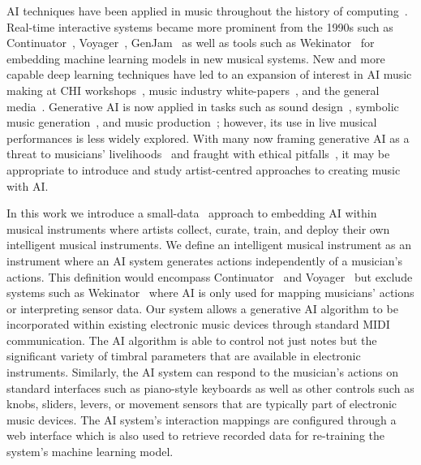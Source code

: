 \documentclass[manuscript,review,anonymous]{acmart}
\begin{document}
AI techniques have been applied in music throughout the history of computing~\cite{roads-music-AI-1985}. Real-time interactive systems became more prominent from the 1990s such as Continuator~\cite{Pachet:2003wd},  Voyager~\cite{Lewis:2000fu}, GenJam~\cite{Biles:2007aa} as well as tools such as Wekinator~\cite{fiebrink_meta-instrument_2009} for embedding machine learning models in new musical systems.
New and more capable deep learning techniques have led to an expansion of interest in AI music making at CHI workshops~\cite{genaichi2022}, music industry white-papers~\cite{goldmedia_ai_2024}, and the general media~\cite{musicpublishers}. Generative AI is now applied in tasks such as sound design~\cite{sound_design_ai_2024}, symbolic music generation~\cite{ji_survey_2024}, and music production~\cite{deruty_development_2022}; however, its use in live musical performances is less widely explored.
With many now framing generative AI as a threat to musicians' livelihoods~\cite{goldmedia_ai_2024} and fraught with ethical pitfalls~\cite{ethical_genaudio_2023}, it may be appropriate to introduce and study artist-centred approaches to creating music with AI.

In this work we introduce a small-data~\cite{Vigliensoni:2022} approach to embedding AI within musical instruments where artists collect, curate, train, and deploy their own intelligent musical instruments.
We define an intelligent musical instrument as an instrument where an AI system generates actions independently of a musician's actions.
This definition would encompass Continuator~\cite{Pachet:2003wd} and Voyager~\cite{Lewis:2000fu} but exclude systems such as Wekinator~\cite{fiebrink_meta-instrument_2009} where AI is only used for mapping musicians' actions or interpreting sensor data.
Our system allows a generative AI algorithm to be incorporated within existing electronic music devices through standard MIDI communication. 
The AI algorithm is able to control not just notes but the significant variety of timbral parameters that are available in electronic instruments. 
Similarly, the AI system can respond to the musician's actions on standard interfaces such as piano-style keyboards as well as other controls such as knobs, sliders, levers, or movement sensors that are typically part of  electronic music devices.
The AI system's interaction mappings are configured through a web interface which is also used to retrieve recorded data for re-training the system's machine learning model.
\end{document}
